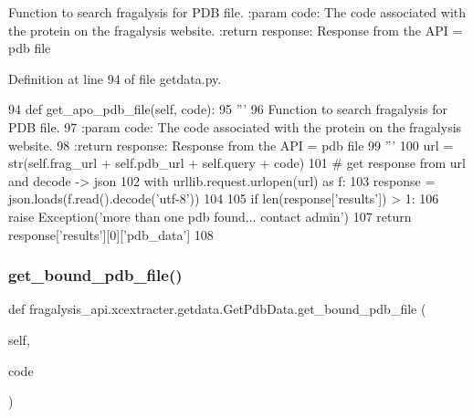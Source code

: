 \begin{DoxyVerb}Function to search fragalysis for PDB file.
:param code: The code associated with the protein on the fragalysis website.
:return response: Response from the API = pdb file
\end{DoxyVerb}
 

Definition at line 94 of file getdata.\+py.


\begin{DoxyCode}
94     \textcolor{keyword}{def }get\_apo\_pdb\_file(self, code):
95         \textcolor{stringliteral}{'''}
96 \textcolor{stringliteral}{        Function to search fragalysis for PDB file.}
97 \textcolor{stringliteral}{        :param code: The code associated with the protein on the fragalysis website.}
98 \textcolor{stringliteral}{        :return response: Response from the API = pdb file}
99 \textcolor{stringliteral}{        '''}
100         url = str(self.frag\_url + self.pdb\_url + self.query + code)
101         \textcolor{comment}{# get response from url and decode -> json}
102         with urllib.request.urlopen(url) \textcolor{keyword}{as} f:
103             response = json.loads(f.read().decode(\textcolor{stringliteral}{'utf-8'}))
104 
105         \textcolor{keywordflow}{if} len(response[\textcolor{stringliteral}{'results'}]) > 1:
106             \textcolor{keywordflow}{raise} Exception(\textcolor{stringliteral}{'more than one pdb found... contact admin'})
107         \textcolor{keywordflow}{return} response[\textcolor{stringliteral}{'results'}][0][\textcolor{stringliteral}{'pdb\_data'}]
108 
\end{DoxyCode}
\mbox{\label{classfragalysis__api_1_1xcextracter_1_1getdata_1_1_get_pdb_data_afcb12b3a8f39a7d54917eefed0a1b4af}} 
\subsubsection{\texorpdfstring{get\+\_\+bound\+\_\+pdb\+\_\+file()}{get\_bound\_pdb\_file()}}
{\footnotesize\ttfamily def fragalysis\+\_\+api.\+xcextracter.\+getdata.\+Get\+Pdb\+Data.\+get\+\_\+bound\+\_\+pdb\+\_\+file (\begin{DoxyParamCaption}\item[{}]{self,  }\item[{}]{code }\end{DoxyParamCaption})}

